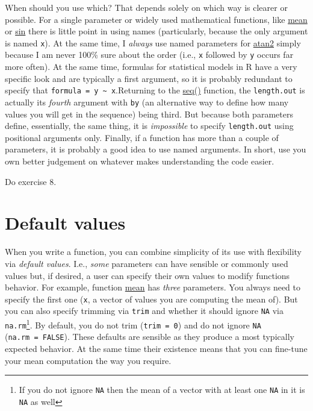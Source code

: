 \documentclass[
]{book}
\begin{document}
When should you use which? That depends solely on which way is clearer or possible. For a single parameter or widely used mathematical functions, like \href{https://stat.ethz.ch/R-manual/R-devel/library/base/html/mean.html}{mean} or \href{https://stat.ethz.ch/R-manual/R-devel/library/base/html/Trig.html}{sin} there is little point in using names (particularly, because the only argument is named \texttt{x}). At the same time, I \emph{always} use named parameters for \href{https://stat.ethz.ch/R-manual/R-devel/library/base/html/Trig.html}{atan2} simply because I am never 100\% sure about the order (i.e., \texttt{x} followed by \texttt{y} occurs far more often). At the same time, formulas for statistical models in R have a very specific look and are typically a first argument, so it is probably redundant to specify that \texttt{formula\ =\ y\ \textasciitilde{}\ x}.Returning to the \href{https://stat.ethz.ch/R-manual/R-devel/library/base/html/seq.html}{seq()} function, the \texttt{length.out} is actually its \emph{fourth} argument with \texttt{by} (an alternative way to define how many values you will get in the sequence) being third. But because both parameters define, essentially, the same thing, it is \emph{impossible} to specify \texttt{length.out} using positional arguments only. Finally, if a function has more than a couple of parameters, it is probably a good idea to use named arguments. In short, use you own better judgement on whatever makes understanding the code easier.

Do exercise 8.

\hypertarget{default-values}{%
\section{Default values}\label{default-values}}

When you write a function, you can combine simplicity of its use with flexibility via \emph{default values}. I.e., \emph{some} parameters can have sensible or commonly used values but, if desired, a user can specify their own values to modify functions behavior. For example, function \href{https://stat.ethz.ch/R-manual/R-devel/library/base/html/mean.html}{mean} has \emph{three} parameters. You always need to specify the first one (\texttt{x}, a vector of values you are computing the mean of). But you can also specify trimming via \texttt{trim} and whether it should ignore \texttt{NA} via \texttt{na.rm}\footnote{If you do not ignore \texttt{NA} then the mean of a vector with at least one \texttt{NA} in it is \texttt{NA} as well}. By default, you do not trim (\texttt{trim\ =\ 0}) and do not ignore \texttt{NA} (\texttt{na.rm\ =\ FALSE}). These defaults are sensible as they produce a most typically expected behavior. At the same time their existence means that you can fine-tune your mean computation the way you require.
\end{document}
